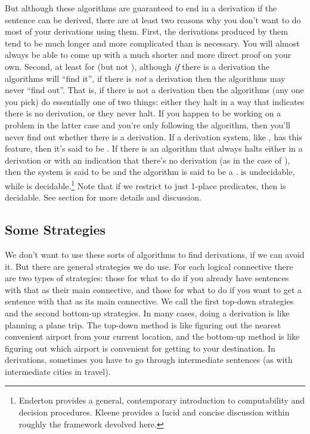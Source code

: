 But although these algorithms are guaranteed to end in a derivation if the sentence can be derived, there are at least two reasons why you don't want to do most of your derivations using them. 
First, the derivations produced by them tend to be much longer and more complicated than is necessary. 
You will almost always be able to come up with a much shorter and more direct proof on your own. 
Second, at least for \GQD{} (but not \GSD{}), although \emph{if} there is a derivation the algorithms will ``find it'', if there is \emph{not} a derivation then the algorithms may never ``find out''. 
That is, if there is not a derivation then the algorithms (any one you pick) do essentially one of two things: either they halt in a way that indicates there is no derivation, or they never halt. 
If you happen to be working on a problem in the latter case and you're only following the algorithm, then you'll never find out whether there is a derivation. 
If a derivation system, like \GQD{}, has this feature, then it's said to be . 
If there is an algorithm that always halts either in a derivation or with an indication that there's no derivation (as in the case of \GSD{}), then the system is said to be  and the algorithm is said to be a .
\GQD{} is undecidable, while \GSD{} is decidable.\footnote{Enderton \citeyearpar{Enderton2010} provides a general, contemporary introduction to computability and decision procedures. Kleene \citeyearpar[ch.~5]{Kleene1967} provides a lucid and concise discussion within roughly the framework devolved here.}
Note that if we restrict \GQL{} to just 1-place predicates, then \GQD{} is decidable.
See section  for more details and discussion.

\subsection{Some Strategies}\label{Sec:Some Strategies}
We don't want to use these sorts of algorithms to find derivations, if we can avoid it. 
But there are general strategies we do use. 
For each logical connective there are two types of strategies: those for what to do if you already have sentences with that as their main connective, and those for what to do if you want to get a sentence with that as its main connective. 
We call the first top-down strategies and the second bottom-up strategies.
In many cases, doing a derivation is like planning a plane trip. The top-down method is like figuring out the nearest convenient airport from your current location, and the bottom-up method is like figuring out which airport is convenient for getting to your destination. In derivations, sometimes you have to go through intermediate sentences (as with intermediate cities in travel).

